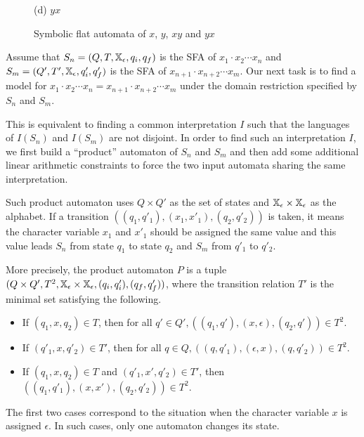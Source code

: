 \documentclass{llncs}
\begin{document}
\begin{figure}
\begin{minipage}[t]{0.28\textwidth}
	
	\centering
	(d) $yx$
	\end{minipage}

	\caption{Symbolic flat automata of $x$, $y$, $xy$ and $yx$}
	\label{fig:sfa}
\end{figure}

Assume that $S_n=(Q,T,\mbox{$\mathbb{X}$}_\epsilon,q_i,q_f)$ is the SFA of $x_1\cdot x_2 \cdots x_n$ and $S_m=(Q',T',\mbox{$\mathbb{X}$}_\epsilon,q'_i,q'_f)$ is the SFA of $x_{n+1}\cdot x_{n+2} \cdots x_m$. Our next task is to find a model for $x_1\cdot x_2 \cdots x_n = x_{n+1}\cdot x_{n+2} \cdots x_m$ under the domain restriction specified by $S_n$ and $S_m$. 

This is equivalent to finding a common interpretation $I$ such that the languages of $I(S_n)$ and $I(S_m)$ are not disjoint. In order to find such an interpretation $I$, we first build a ``product'' automaton of $S_n$ and $S_m$ and then add some additional linear arithmetic constraints to force the two input automata sharing the same interpretation. 

Such product automaton uses $Q\times Q'$ as the set of states and $\mbox{$\mathbb{X}$}_\epsilon \times \mbox{$\mathbb{X}$}_\epsilon$ as the alphabet. If a transition $((q_1,q'_1), (x_1,x'_1),(q_2,q'_2))$ is taken, it means the character variable $x_1$ and $x'_1$ should be assigned the same value and this value leads $S_n$ from state $q_1$ to state $q_2$ and $S_m$ from $q'_1$ to $q'_2$.

More precisely, the product automaton $P$ is a tuple $(Q\times Q', T^2, \mbox{$\mathbb{X}$}_\epsilon \times \mbox{$\mathbb{X}$}_\epsilon, (q_i,q'_i),(q_f,q'_f))$, where the transition relation $T'$ is the minimal set satisfying the following.

\begin{itemize}
\item If $(q_1,x,q_2) \in T$, then for all $q'\in Q',((q_1,q'),(x,\epsilon),(q_2,q'))\in T^2$.
\item If $(q'_1,x,q'_2) \in T'$, then for all $q\in Q,((q,q'_1),(\epsilon,x),(q,q'_2))\in T^2$.
\item If $(q_1,x,q_2) \in T$ and $(q'_1,x',q'_2) \in T'$, then $((q_1,q'_1),(x,x'),(q_2,q'_2))\in T^2$.
\end{itemize}	
The first two cases correspond to the situation when the character variable $x$ is assigned $\epsilon$. In such cases, only one automaton changes its state.
\end{document}
